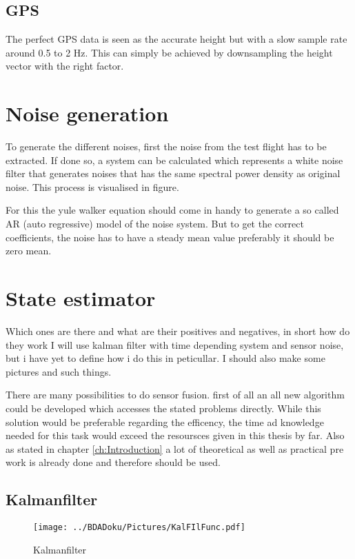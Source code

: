   \subsection{GPS}
  The perfect GPS data is seen as the accurate height but with a slow sample rate around 0.5 to 2 Hz.
  This can simply be achieved by downsampling the height vector with the right factor.
  
  
  \section{Noise generation}
  To generate the different noises, first the noise from the test flight has to be extracted.
  If done so, a system can be calculated which represents a white noise filter that generates noises
  that has the same spectral power density as original noise. This process is visualised in figure.
  
  
  
  For this the yule walker equation should come in handy to generate a so called AR (auto regressive) model of the noise system.
  But to get the correct coefficients, the noise has to have a steady mean value preferably it should be zero mean.  
  
  \section{State estimator}
  Which ones are there and what are their positives and negatives, in short how do they work
  I will use kalman filter with time depending system and sensor noise, but i have yet to define how i do this in peticullar.
  I should also make some pictures and such things.
  
  There are many possibilities to do sensor fusion. first of all an all new algorithm could be developed which accesses the 
  stated problems directly. While this solution would be preferable regarding the efficency, the 
  time ad knowledge needed for this task would exceed the resoursces given in this thesis by far.
  Also as stated in chapter \ref{ch:Introduction} a lot of theoretical as well as practical pre work is
  already done and therefore should be used. 
  
  \subsection{Kalmanfilter}
  
  \begin{figure}[h!]
  \centering
  \texttt{[image: ../BDADoku/Pictures/KalFIlFunc.pdf]}
  \caption{Kalmanfilter}
  \label{fig:Kalmanfilter}
  \end{figure}
 
